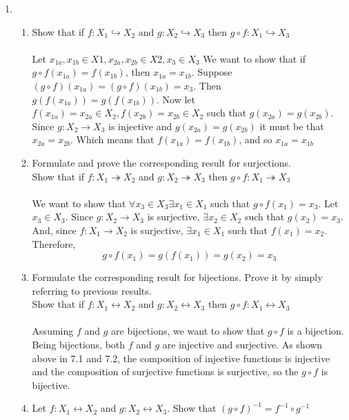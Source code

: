 \documentclass[11pt]{article}
\begin{document}
\begin{enumerate}
\newpage
\item
\begin{enumerate}
\item Show that if $f :X_1 \hookrightarrow X_2$ and $g :X_2 \hookrightarrow X_3$ then $g \circ f: X_1 \hookrightarrow X_3$\\\\
Let $x_{1a}, x_{1b} \in X1, x_{2a}, x_{2b} \in X2, x_3 \in X_3$
We want to show that if $g \circ f(x_{1a}) = f(x_{1b})$, then $x_{1a} = x_{1b}$.  Suppose $(g \circ f)(x_{1a}) = (g \circ f)(x_{1b}) = x_3$.  Then $g(f(x_{1a})) = g(f(x_{1b}))$.  Now let $f(x_{1a}) = x_{2a} \in X_2, f(x_{2b}) = x_{2b} \in X_2$ such that $g(x_{2a}) = g(x_{2b})$.  Since $g : X_2 \to X_3$ is injective and $g(x_{2a}) = g(x_{2b})$ it must be that $x_{2a} = x_{2b}$.  Which means that $f(x_{1a}) = f(x_{1b})$, and so $x_{1a} = x_{1b}$
\\
\item Formulate and prove the corresponding result for surjections.\\
Show that if $f :X_1 \twoheadrightarrow X_2$ and $g :X_2 \twoheadrightarrow X_3$ then $g \circ f: X_1 \twoheadrightarrow X_3$\\\\
We want to show that $\forall x_3 \in X_3 \exists x_1 \in X_1$ such that $g \circ f(x_1) = x_3$.  Let $x_3 \in X_3$.  Since $g : X_2 \to X_3$ is surjective, $\exists x_2 \in X_2$ such that $g(x_2) = x_3$.  And, since $f : X_1 \to X_2$ is surjective, $\exists x_1 \in X_1$ such that $f(x_1) = x_2$.  Therefore, 
$$g \circ f(x_1) = g(f(x_1)) = g(x_2) = x_3$$
\item Formulate the corresponding result for bijections. Prove it by simply referring to previous results.\\
Show that if $f :X_1 \leftrightarrow X_2$ and $g :X_2 \leftrightarrow X_3$ then $g \circ f: X_1 \leftrightarrow X_3$\\\\
Assuming $f$ and $g$ are bijections, we want to show that $g \circ f$ is a bijection.  Being bijections, both $f$ and $g$ are injective and surjective.  As shown above in 7.1 and 7.2, the composition of injective functions is injective and the composition of surjective functions is surjective, so the $g \circ f$ is bijective.
\\
\item Let $f :X_1 \leftrightarrow X_2$ and $g :X_2 \leftrightarrow X_3$.  Show that $(g \circ f)^{-1} = f^{-1} \circ g^{-1}$\\\\

\end{enumerate}
\end{enumerate}
\end{document}
